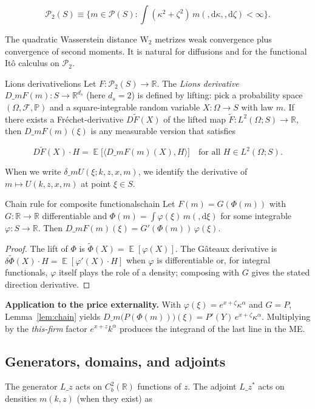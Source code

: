 \documentclass[11pt,letterpaper,oneside]{article}
\numberwithin{equation}{section}
\DeclareMathOperator{\E}{\mathbb{E}}
\newcommand{\R}{\mathbb{R}}
\newcommand{\1}{\mathbf{1}}
\newcommand{\diff}{,\mathrm{d}}
\newcommand{\Lz}{L\_z}
\newcommand{\Lzadj}{L\_z^{\!*}}
\newcommand{\dmU}{\delta\_m U}
\newcommand{\Dm}{D\_m}
\newcommand{\ip}[2]{\langle #1,#2\rangle}
\begin{document}
$$
\mathcal P_2(S)\equiv\Big\{ m\in\mathcal P(S): \int (\kappa^2 + \zeta^2)\, m(\diff\kappa,\diff\zeta) < \infty\Big\}.
$$

The quadratic Wasserstein distance $\mathrm{W}_2$ metrizes weak convergence plus convergence of second moments. It is natural for diffusions and for the functional Itô calculus on $\mathcal P_2$.

\begin{definition}{Lions derivative}{lions}
Let $F:\mathcal P_2(S)\to\R$. The \emph{Lions derivative} $\Dm F(m):S\to\R^{d_s}$ (here $d_s=2$) is defined by lifting: pick a probability space $(\Omega,\mathcal F,\mathbb P)$ and a square-integrable random variable $X:\Omega\to S$ with law $m$. If there exists a Fréchet-derivative $D\tilde F(X)$ of the lifted map $\tilde F: L^2(\Omega;S)\to\R$, then $\Dm F(m)(\xi)$ is any measurable version that satisfies

$$
D\tilde F(X)\cdot H = \E\big[\ip{ \Dm F(m)(X)}{H}\big]\quad\text{for all }H\in L^2(\Omega;S).
$$

When we write $\dmU(\xi;k,z,x,m)$, we identify the derivative of $m\mapsto U(k,z,x,m)$ at point $\xi\in S$.
\end{definition}

\begin{lemma}{Chain rule for composite functionals}{chain}
Let $F(m)=G(\Phi(m))$ with $G:\R\to\R$ differentiable and $\Phi(m)=\int \varphi(\xi)\,m(\diff\xi)$ for some integrable $\varphi:S\to\R$. Then $\Dm F(m)(\xi)=G'(\Phi(m))\,\varphi(\xi)$.
\end{lemma}

\begin{proof}
The lift of $\Phi$ is $\tilde\Phi(X)=\E[\varphi(X)]$. The Gâteaux derivative is $\delta \tilde\Phi(X)\cdot H=\E[\varphi'(X)\cdot H]$ when $\varphi$ is differentiable or, for integral functionals, $\varphi$ itself plays the role of a density; composing with $G$ gives the stated direction derivative.
\end{proof}

\begin{tcolorbox}[mathstyle]
\textbf{Application to the price externality.} With $\varphi(\xi)=e^{x+\zeta}\kappa^\alpha$ and $G=P$, Lemma~\ref{lem:chain} yields
$\Dm\big(P(\Phi(m))\big)(\xi)=P'(Y)\,e^{x+\zeta}\kappa^\alpha$.
Multiplying by the \emph{this-firm} factor $e^{x+z}k^\alpha$ produces the integrand of the last line in the ME.
\end{tcolorbox}

\subsection{Generators, domains, and adjoints}
The generator $\Lz$ acts on $C_b^2(\R)$ functions of $z$. The adjoint $\Lzadj$ acts on densities $m(k,z)$ (when they exist) as
\end{document}
